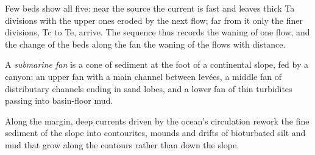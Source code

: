 Few beds show all five: near the source the current is fast and leaves thick
Ta divisions with the upper ones eroded by the next flow; far from it only
the finer divisions, Tc to Te, arrive. The sequence thus records the
waning of one flow, and the change of the beds along the fan the waning of
the flows with distance.

\begin{definition}\label{def:b3:facies-models:fan}
A \emph{submarine fan} is a cone of sediment at the foot
of a continental slope, fed by a canyon: an upper fan with a main channel
between levées, a middle fan of distributary channels ending in sand lobes,
and a lower fan of thin turbidites passing into basin-floor mud.
\end{definition}

Along the margin, deep currents driven by the ocean's circulation rework the
fine sediment of the slope into contourites, mounds and drifts of
bioturbated silt and mud that grow along the contours rather than down the
slope.

